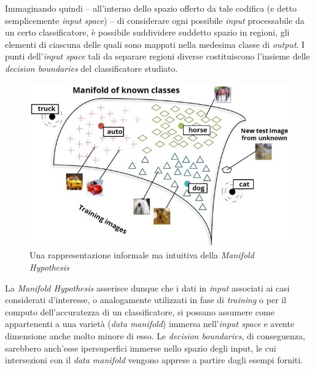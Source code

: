 \documentclass[a4paper, twoside]{article}
\begin{document}
Immaginando quindi -- all'interno dello spazio offerto da tale codifica (e detto semplicemente \textit{input space}) -- di considerare ogni possibile \textit{input} processabile da un certo classificatore, è possibile suddividere suddetto spazio in regioni, gli elementi di ciascuna delle quali sono mappati nella medesima classe di \textit{output}. I punti dell'\textit{input space} tali da separare regioni diverse costituiscono l'insieme delle \textit{decision boundaries} del classificatore studiato.



\begin{figure}
	\includegraphics[width=0.94\linewidth]{manifold-hyp.jpeg}
	\captionsetup{labelformat=empty}
	\caption{Una rappresentazione informale ma intuitiva della \textit{Manifold Hypothesis}}
\end{figure}


La \textit{Manifold Hypothesis} asserisce dunque che i dati in \textit{input} associati ai casi considerati d'interesse, o analogamente utilizzati in fase di \textit{training} o per il computo dell'accuratezza di un classificatore, si possano assumere come appartenenti a una varietà (\textit{data manifold}) immersa nell'\textit{input space} e avente dimensione anche molto minore di esso. Le \textit{decision boundaries}, di conseguenza, sarebbero anch'esse ipersuperfici immerse nello spazio degli input, le cui intersezioni con il \textit{data manifold} vengono apprese a partire dagli esempi forniti.
\end{document}
